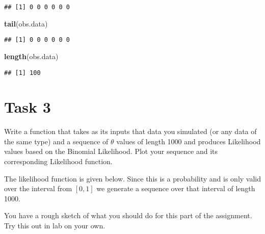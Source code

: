\documentclass[
]{article}
\newenvironment{Shaded}{\begin{snugshade}}{\end{snugshade}}
\newcommand{\KeywordTok}[1]{\textcolor[rgb]{0.13,0.29,0.53}{\textbf{#1}}}
\newcommand{\NormalTok}[1]{#1}
\begin{document}
\begin{verbatim}
## [1] 0 0 0 0 0 0
\end{verbatim}

\begin{Shaded}
\begin{Highlighting}[]
\KeywordTok{tail}\NormalTok{(obs.data)}
\end{Highlighting}
\end{Shaded}

\begin{verbatim}
## [1] 0 0 0 0 0 0
\end{verbatim}

\begin{Shaded}
\begin{Highlighting}[]
\KeywordTok{length}\NormalTok{(obs.data)}
\end{Highlighting}
\end{Shaded}

\begin{verbatim}
## [1] 100
\end{verbatim}

\hypertarget{task-3}{%
\section{Task 3}\label{task-3}}

Write a function that takes as its inputs that data you simulated (or
any data of the same type) and a sequence of \(\theta\) values of length
1000 and produces Likelihood values based on the Binomial Likelihood.
Plot your sequence and its corresponding Likelihood function.

The likelihood function is given below. Since this is a probability and
is only valid over the interval from \([0, 1]\) we generate a sequence
over that interval of length 1000.

You have a rough sketch of what you should do for this part of the
assignment. Try this out in lab on your own.
\end{document}
